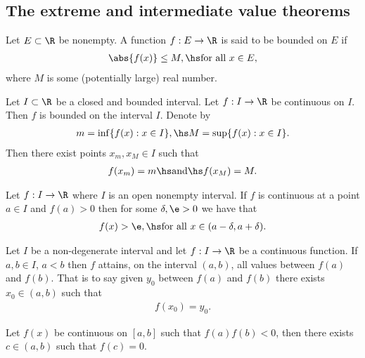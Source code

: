\documentclass{article}
\begin{document}
\subsection{The extreme and intermediate value theorems}

\begin{definition}
    Let $E\subset\R$ be nonempty. A function $f:E\to\R$ is said to be
    bounded on $E$ if
    \begin{align*}
        \abs{f(x)}\leq M,\hs\text{for all } x\in E,
    \end{align*}
    where $M$ is some (potentially large) real number.
\end{definition}

\begin{theorem}
    Let $I\subset\R$ be a closed and bounded interval. Let
    $f:I\to\R$ be continuous on $I$. Then $f$ is bounded on the interval
    $I$. Denote by
    \begin{align*}
        m=\inf\{f(x):x\in I\},\hs M=\sup\{f(x):x\in I\}.
    \end{align*} 
    Then there exist points $x_m,x_M\in I$ such that
    \begin{align*}
        f(x_m)=m\hs\text{and}\hs f(x_M)=M.
    \end{align*}
\end{theorem}

\setcounter{theorem}{3}
\begin{lemma}
    Let $f:I\to\R$ where $I$ is an open nonempty interval. If $f$ is
    continuous at a point $a\in I$ and $f(a)>0$ then for some
    $\delta,\e>0$ we have that
    \begin{align*}
        f(x)>\e,\hs \text{for all }x\in(a-\delta, a+\delta).
    \end{align*}
\end{lemma}

\begin{theorem}
    Let $I$ be a non-degenerate interval and let $f:I\to\R$ be a
    continuous function. If $a,b\in I$, $a<b$ then $f$ attains,
    on the interval $(a,b)$, all values between $f(a)$ and $f(b)$.
    That is to say given $y_0$ between $f(a)$ and $f(b)$ there
    exists $x_0\in(a,b)$ such that
    \begin{align*}
        f(x_0)=y_0.
    \end{align*} 
\end{theorem}

\begin{theorem}
    Let $f(x)$ be continuous on $[a,b]$ such that $f(a)f(b)<0$, 
    then there exists $c\in(a,b)$ such that $f(c)=0$. 
\end{theorem}
\end{document}
